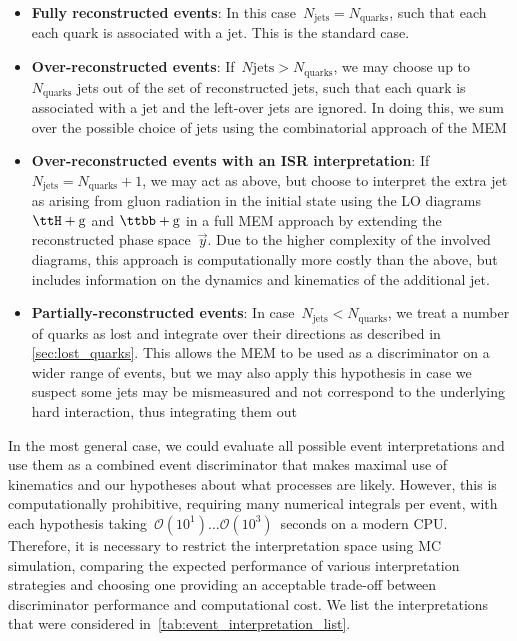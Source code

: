 \begin{itemize}
\item \textbf{Fully reconstructed events}: In this case~$N_{\mathrm{jets}} = N_{\mathrm{quarks}}$, such that each each quark is associated with a jet. This is the standard case.
\item \textbf{Over-reconstructed events}: If~$N{\mathrm{jets}} > N_{\mathrm{quarks}}$, we may choose up to $N_{\mathrm{quarks}}$ jets out of the set of reconstructed jets, such that each quark is associated with a jet and the left-over jets are ignored. In doing this, we sum over the possible choice of jets using the combinatorial approach of the MEM
\item \textbf{Over-reconstructed events with an ISR interpretation}: If~$N_{\mathrm{jets}} = N_{\mathrm{quarks}} + 1$, we may act as above, but choose to interpret the extra jet as arising from gluon radiation in the initial state using the LO diagrams~$\ttH + \mathrm{g}$ and  $\ttbb + \mathrm{g}$ in a full MEM approach by extending the reconstructed phase space~$\vec{y}$. Due to the higher complexity of the involved diagrams, this approach is computationally more costly than the above, but includes information on the dynamics and kinematics of the additional jet.
\item \textbf{Partially-reconstructed events}: In case~$N_{\mathrm{jets}} < N_{\mathrm{quarks}}$, we treat a number of quarks as lost and integrate over their directions as described in \cref{sec:lost_quarks}. This allows the MEM to be used as a discriminator on a wider range of events, but we may also apply this hypothesis in case we suspect some jets may be mismeasured and not correspond to the underlying hard interaction, thus integrating them out
\end{itemize}

In the most general case, we could evaluate all possible event interpretations and use them as a combined event discriminator that makes maximal use of kinematics and our hypotheses about what processes are likely. However, this is computationally prohibitive, requiring many numerical integrals per event, with each hypothesis taking~$\mathcal{O}(10^1)\dots \mathcal{O}(10^3)$~seconds on a modern CPU. Therefore, it is necessary to restrict the interpretation space using MC simulation, comparing the expected performance of various interpretation strategies and choosing one providing an acceptable trade-off between discriminator performance and computational cost. We list the interpretations that were considered in~\cref{tab:event_interpretation_list}.

